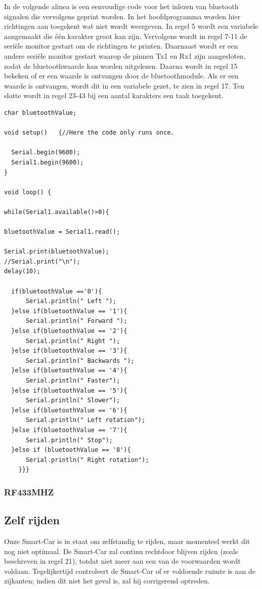 In de volgende alinea is een eenvoudige code voor het inlezen van bluetooth signalen die vervolgens geprint worden. In het hoofdprogramma worden hier richtingen aan toegekent wat niet wordt weergeven. In regel 5 wordt een variabele aangemaakt die één karakter groot kan zijn. Vervolgens wordt in regel 7-11 de seriële monitor gestart om de richtingen te printen. Daarnaast wordt er een andere seriële monitor gestart waarop de pinnen Tx1 en Rx1 zijn aangesloten, zodat de bluetoothwaarde kan worden uitgelezen. Daarna wordt in regel 15 bekeken of er een waarde is ontvangen door de bluetoothmodule. Als er een waarde is ontvangen, wordt dit in een variabele gezet, te zien in regel 17. Ten slotte wordt in regel 23-43 bij een aantal karakters een taak toegekent.
\newpage
\begin{lstlisting}
char bluetoothValue;

void setup()   {//Here the code only runs once.
  
  Serial.begin(9600);
  Serial1.begin(9600);
}

void loop() {

while(Serial1.available()>0){ 
  
bluetoothValue = Serial1.read();

Serial.print(bluetoothValue);
//Serial.print("\n");
delay(10);

  if(bluetoothValue =='0'){
      Serial.println(" Left ");
  }else if(bluetoothValue == '1'){
      Serial.println(" Forward ");
  }else if(bluetoothValue == '2'){
      Serial.println(" Right ");
  }else if(bluetoothValue == '3'){
      Serial.println(" Backwards ");
  }else if(bluetoothValue == '4'){
      Serial.println(" Faster");
  }else if(bluetoothValue == '5'){
      Serial.println(" Slower");
  }else if(bluetoothValue == '6'){
      Serial.println(" Left rotation");
  }else if(bluetoothValue == '7'){
      Serial.println(" Stop");
  }else if (bluetoothValue == '8'){
      Serial.println(" Right rotation"); 
    }}}
\end{lstlisting}
\subsubsection{RF433MHZ}

\subsection{Zelf rijden}
Onze \gls{Smart-Car} is in staat om zelfstandig te rijden, maar momenteel werkt dit nog niet optimaal. De \gls{Smart-Car} zal continu rechtdoor blijven rijden (zoals beschreven in regel 21), totdat niet meer aan een van de voorwaarden wordt voldaan. Tegelijkertijd controleert de \gls{Smart-Car} of er voldoende ruimte is aan de zijkanten; indien dit niet het geval is, zal hij corrigerend optreden.

